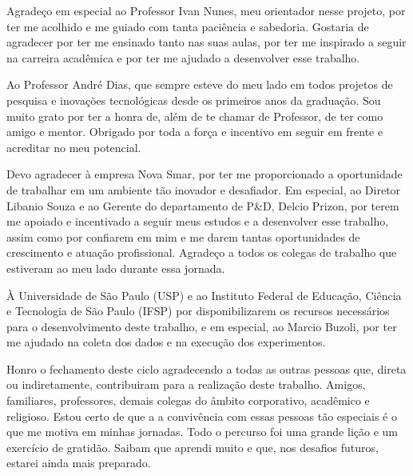 \begin{agradecimentos}
    Agradeço em especial ao Professor Ivan Nunes, meu orientador nesse projeto, por ter me acolhido e me guiado com tanta paciência e sabedoria. Gostaria de agradecer por ter me ensinado tanto nas suas aulas, por ter me inspirado a seguir na carreira acadêmica e por ter me ajudado a desenvolver esse trabalho.

    Ao Professor André Dias, que sempre esteve do meu lado em todos projetos de pesquisa e inovações tecnológicas desde os primeiros anos da graduação. Sou muito grato por ter a honra de, além de te chamar de Professor, de ter como amigo e mentor. Obrigado por toda a força e incentivo em seguir em frente e acreditar no meu potencial.

    Devo agradecer à empresa Nova Smar, por ter me proporcionado a oportunidade de trabalhar em um ambiente tão inovador e desafiador. Em especial, ao Diretor Libanio Souza e ao Gerente do departamento de P\&D, Delcio Prizon, por terem me apoiado e incentivado a seguir meus estudos e a desenvolver esse trabalho, assim como por confiarem em mim e me darem tantas oportunidades de crescimento e atuação profissional. Agradeço a todos os colegas de trabalho que estiveram ao meu lado durante essa jornada.

    À Universidade de São Paulo (USP) e ao Instituto Federal de Educação, Ciência e Tecnologia de São Paulo (IFSP) por disponibilizarem os recursos necessários para o desenvolvimento deste trabalho, e em especial, ao Marcio Buzoli, por ter me ajudado na coleta dos dados e na execução dos experimentos.

    Honro o fechamento deste ciclo agradecendo a todas as outras pessoas que, direta ou indiretamente, contribuiram para a realização deste trabalho. Amigos, familiares, professores, demais colegas do âmbito corporativo, acadêmico e religioso. Estou certo de que a a convivência com essas pessoas tão especiais é o que me motiva em minhas jornadas. Todo o percurso foi uma grande lição e um exercício de gratidão. Saibam que aprendi muito e que, nos desafios futuros, estarei ainda mais preparado.
	
\end{agradecimentos}